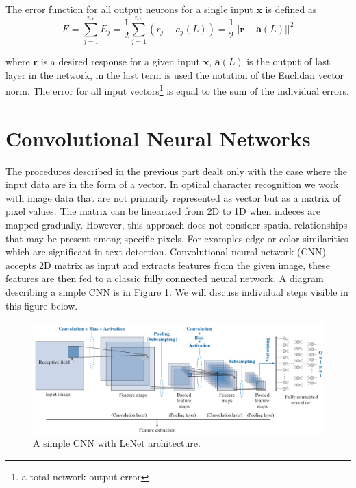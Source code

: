 The error function for all output neurons for a single input $\bm{x}$ is defined as
\begin{equation} E = \sum_{j=1} ^{n_L} E_j = \frac{1}{2}\sum_{j=1} ^{n_L} (r_j-a_j(L)) = \frac{1}{2} ||\bm{r} - \bm{a}(L)||^2 \end{equation}

where $\bm{r}$ is a desired response for a given input $\bm{x}$, $\bm{a}(L)$ is the output of last layer in the network, in the last term is used the notation of the Euclidan vector norm. The error for all input vectors\footnote{a total  network output error} is equal to the sum of the individual errors. \cite{DIP}

\section{Convolutional Neural Networks}

The procedures described in the previous part dealt only with the case where the input data are in the form of a vector. In optical character recognition we work with image data that are not primarily represented as vector but as a matrix of pixel values. The matrix can be linearized from 2D to 1D when indeces are mapped gradually. However,  this approach does not consider spatial relationships that may be present among specific pixels. For examples edge or color similarities which are significant in text detection. Convolutional neural network (CNN) accepts 2D matrix as input and extracts features from the given image, these features are then fed to a classic fully connected neural network. A diagram describing  a simple CNN is in Figure \ref*{img:CNN}. We will discuss individual steps visible in this figure below.\cite{DIP}

\begin{figure}[hbtp]
    \centering
    \includegraphics[scale=0.4]{obrazky/CNN.png}

    \caption{A simple CNN with LeNet architecture.\cite[altered]{DIP}}
    \label{img:CNN}
\end{figure}

